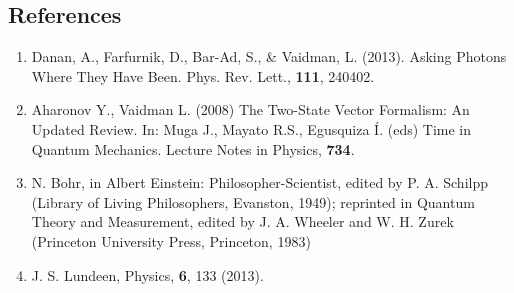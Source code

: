 \documentclass{article}
\begin{document}
\subsection*{References}

\begin{enumerate}
	\item   Danan, A., Farfurnik, D., Bar-Ad, S., \& Vaidman, L. (2013).  
		Asking Photons Where They Have Been. Phys. Rev. Lett., 
		\textbf{111}, 240402.
	\item  	Aharonov Y., Vaidman L. (2008) The Two-State Vector Formalism: 
		An Updated Review. In: Muga J., Mayato R.S., Egusquiza Í. (eds) 
		Time in Quantum Mechanics.  Lecture Notes in Physics, \textbf{734}.  

	\item 	N. Bohr, in Albert Einstein: Philosopher-Scientist, edited by 
		P.  A. Schilpp (Library of Living Philosophers, Evanston, 
		1949); reprinted in Quantum Theory and Measurement, edited by 
		J. A.  Wheeler and W. H. Zurek (Princeton University Press, 
		Princeton, 1983)

	\item	J. S. Lundeen, Physics, \textbf 6, 133 (2013).

\end{enumerate}

\nocite{*}
\end{document}
